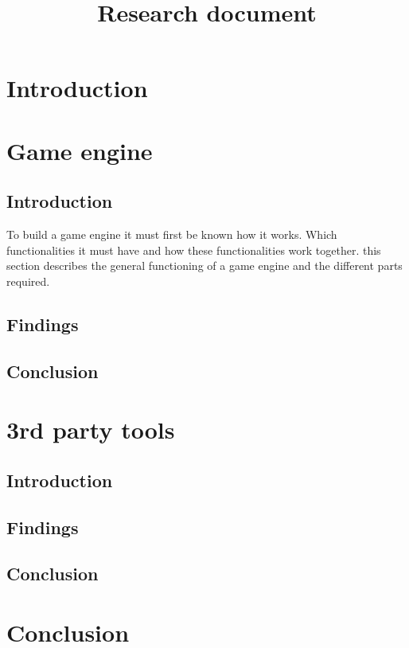 \documentclass{projdoc}
\title{Research document}
\begin{document}
\tablestables
\section{Introduction}
\section{Game engine}
    \subsection{Introduction}
    To build a game engine it must first be known how it works. 
    Which functionalities it must have and how these functionalities work together.
    this section describes the general functioning of a game engine and the different parts required.
    \subsection{Findings}
    \subsection{Conclusion}

\section{3rd party tools}
\subsection{Introduction}
\subsection{Findings}
\subsection{Conclusion}
\section{Conclusion}
\end{document}
